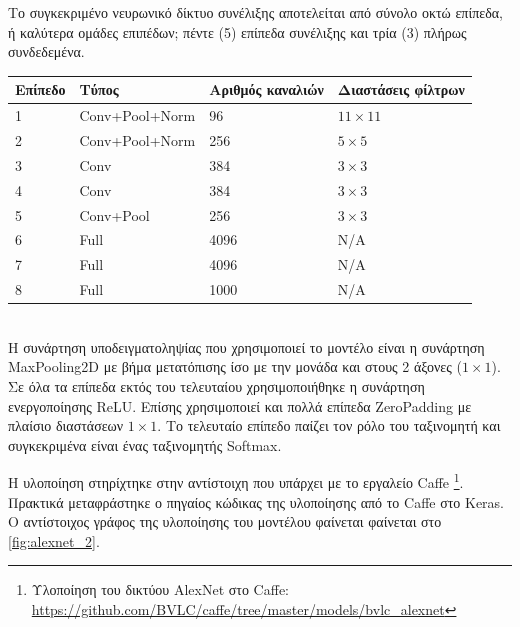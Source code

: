 Το συγκεκριμένο νευρωνικό δίκτυο συνέλιξης αποτελείται από σύνολο οκτώ επίπεδα,
ή καλύτερα ομάδες επιπέδων; πέντε (5) επίπεδα συνέλιξης και τρία (3) πλήρως συνδεδεμένα. \\

\begin{tabular}{ | l | l | l | l | }
  \hline
  \rowcolor{Gray}
  Επίπεδο  & Τύπος & Αριθμός καναλιών & Διαστάσεις φίλτρων \\
  \hline
  1 & Conv+Pool+Norm & 96 & $11 \times 11$ \\
  2 & Conv+Pool+Norm & 256 & $5 \times 5$ \\
  3 & Conv & 384 & $3 \times 3$ \\
  4 & Conv & 384 & $3 \times 3$ \\
  5 & Conv+Pool & 256 & $3 \times 3$ \\
  6 & Full & 4096 & Ν/A \\
  7 & Full & 4096 & N/A \\
  8 & Full & 1000 & N/A \\
  \hline
\end{tabular}
\\

Η συνάρτηση υποδειγματοληψίας που χρησιμοποιεί το μοντέλο είναι η συνάρτηση
MaxPooling2D με βήμα μετατόπισης ίσο με την μονάδα και στους 2 άξονες ($1 \times 1$).
Σε όλα τα επίπεδα εκτός του τελευταίου χρησιμοποιήθηκε η συνάρτηση ενεργοποίησης
ReLU. Επίσης χρησιμοποιεί και πολλά επίπεδα ZeroPadding με πλαίσιο
διαστάσεων $1 \times 1$. Το τελευταίο επίπεδο παίζει τον ρόλο του ταξινομητή και συγκεκριμένα
είναι ένας ταξινομητής Softmax.

Η υλοποίηση στηρίχτηκε στην αντίστοιχη που υπάρχει με το εργαλείο Caffe
\footnote{Υλοποίηση του δικτύου AlexNet στο Caffe: \url{https://github.com/BVLC/caffe/tree/master/models/bvlc_alexnet}}.
Πρακτικά μεταφράστηκε ο πηγαίος κώδικας της υλοποίησης από το Caffe στο Keras.
Ο αντίστοιχος γράφος της υλοποίησης του μοντέλου
φαίνεται φαίνεται στο \autoref{fig:alexnet_2}.


